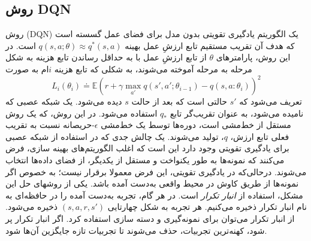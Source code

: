 \subsection{روش DQN}
روش 
\textit{}
(DQN)
\cite{mnih2013playing}
 یک الگوریتم یادگیری تقویتی بدون مدل برای فضای عمل گسسته است که هدف آن تقریب مستقیم تابع ارزشِ عمل بهینه 
 $q(s,a; \theta) \approx  q^*(s,a)$
 است. در این روش، پارامترهای $\theta$ از تابع ارزشِ عمل با به حداقل رساندن تابع هزینه به شکل مرحله به مرحله آموخته می‌شوند، به شکلی که تابع هزینه $i$ام به صورت
 $$L_i(\theta_i) \doteq \mathbb{E} {\left( r+\gamma \max_{a'} q(s',a'; \theta_{i-1})- q(s,a:\theta_i) \right)}^2$$
 تعریف می‌شود که 
$s'$
 حالتی است که بعد از حالت $s$ دیده می‌شود. یک شبکه عصبی که 
\textit{}
  نامیده می‌شود، به عنوان تقریب‌گر تابع
   $q_*$
    استفاده می‌شود.
در این روش، که یک روش مستقل از خط‌مشی است، دوره‌ها توسط یک خط‌مشی 
$\epsilon$-حریصانه
نسبت به تقریب فعلی تابع ارزش، $q$، تولید می‌شوند. 
یک چالش جدی که در استفاده از شبکه عصبی برای یادگیری تقویتی وجود دارد این است که اغلب الگوریتم‌های بهینه‌ سازی، فرض می‌کنند که نمونه‌ها به طور یکنواخت و مستقل از یکدیگر، از فضای داده‌ها انتخاب می‌شوند. درحالی‌که در یادگیری تقویتی، این فرض معمولا برقرار نیست؛ به خصوص اگر نمونه‌ها از طریق کاوش در محیط واقعی به‌دست آمده باشد. یکی از روش\nf های  حل این مشکل، استفاده از 
\textit{انبار تکرار}
است. در هر گام، تجربه به‌دست آمده را در حافظه‌ای به نام انبار تکرار ذخیره می‌کنیم. هر تجربه به شکل چهارتایی 
$(s,a,r,s')$
ذخیره می‌شود. از انبار تکرار می‌توان برای نمونه‌گیری و دسته  سازی استفاده کرد. اگر انبار تکرار پر شود، کهنه‌ترین تجربیات، حذف می‌شوند تا تجربیات تازه جایگزین آن‌ها شود.


